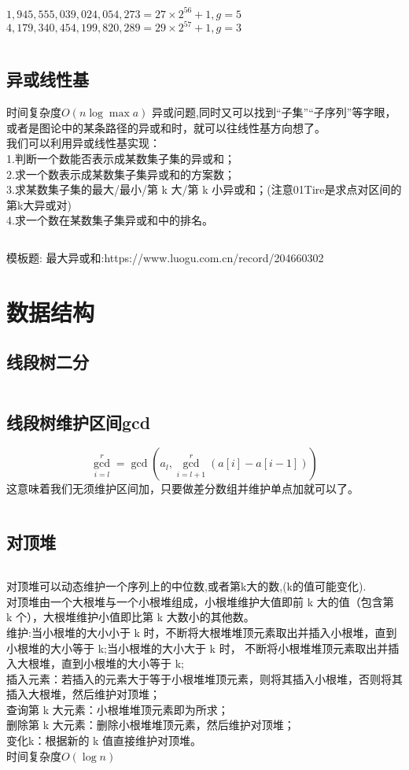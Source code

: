 \documentclass[titlepage, a4paper]{report}
\newcommand{\cppcode}[1]{  
    \inputminted[mathescape]{cpp}{source/#1}  
}
\begin{document}
$1,945,555,039,024,054,273=27\times 2^{56}+1,g=5$\\

$4,179,340,454,199,820,289=29\times 2^{57}+1,g=3$

\cppcode{Ploy.cpp}

\section{异或线性基}
时间复杂度$O(n\log{\max{a}})$
异或问题,同时又可以找到“子集”“子序列”等字眼，或者是图论中的某条路径的异或和时，就可以往线性基方向想了。\\
我们可以利用异或线性基实现：\\
1.判断一个数能否表示成某数集子集的异或和；\\
2.求一个数表示成某数集子集异或和的方案数；\\
3.求某数集子集的最大/最小/第 k 大/第 k 小异或和；(注意01Tire是求点对区间的第k大异或对) \\
4.求一个数在某数集子集异或和中的排名。\\
\cppcode{basis.cpp}
模板题:
最大异或和:https://www.luogu.com.cn/record/204660302


\chapter{数据结构}
\section{线段树二分}
\cppcode{segment_tree.cpp}
\section{线段树维护区间gcd}
$$
\gcd_{i=l}^{r}=\gcd(a_l,\gcd_{i=l+1}^{r}(a[i]-a[i-1]))
$$
这意味着我们无须维护区间加，只要做差分数组并维护单点加就可以了。\\
\cppcode{segtgcd.cpp}

\section{对顶堆}
\cppcode{Maxheap.cpp}
对顶堆可以动态维护一个序列上的中位数,或者第k大的数,(k的值可能变化).\\
对顶堆由一个大根堆与一个小根堆组成，小根堆维护大值即前 k 大的值（包含第 k 个），大根堆维护小值即比第 k 大数小的其他数。\\
维护:当小根堆的大小小于 k 时，不断将大根堆堆顶元素取出并插入小根堆，直到小根堆的大小等于 k;当小根堆的大小大于 k 时，
不断将小根堆堆顶元素取出并插入大根堆，直到小根堆的大小等于 k;\\
插入元素：若插入的元素大于等于小根堆堆顶元素，则将其插入小根堆，否则将其插入大根堆，然后维护对顶堆；\\
查询第 k 大元素：小根堆堆顶元素即为所求；\\
删除第 k 大元素：删除小根堆堆顶元素，然后维护对顶堆；\\
变化k：根据新的 k 值直接维护对顶堆。\\
时间复杂度$O(\log{n})$
\cppcode{对顶堆.cpp}
\end{document}
